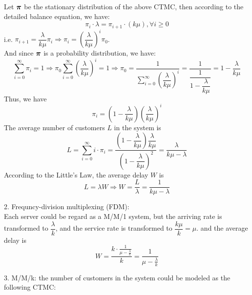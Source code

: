 \begin{homeworkProblem}
Let $\boldsymbol{\pi}$ be the stationary distribution of the above CTMC, then according to the detailed balance equation, we have:
$$\pi_i\cdot\lambda = \pi_{i+1}\cdot(k\mu), \forall i\geq 0$$
i.e. $\pi_{i+1} = \dfrac{\lambda}{k\mu}\pi_i\Rightarrow \pi_i = \left(\dfrac{\lambda}{k\mu}\right)^i\pi_0$. \\
And since $\boldsymbol{\pi}$ is a probability distribution, we have:
$$\sum_{i=0}^{\infty}\pi_i = 1\Rightarrow \pi_0\sum_{i=0}^{\infty}\left(\dfrac{\lambda}{k\mu}\right)^i = 1\Rightarrow \pi_0 = \dfrac{1}{\sum\limits_{i=0}^{\infty}\left(\dfrac{\lambda}{k\mu}\right)^i} = \dfrac{1}{\dfrac{1}{1-\dfrac{\lambda}{k\mu}}}=1-\dfrac{\lambda}{k\mu}$$
Thus, we have
$$\pi_i=\left(1-\dfrac{\lambda}{k\mu}\right)\left(\dfrac{\lambda}{k\mu}\right)^i$$
The average number of customers $L$ in the system is
$$L=\sum_{i=0}^{\infty}i\cdot\pi_i = \dfrac{\left(1-\dfrac{\lambda}{k\mu}\right)\dfrac{\lambda}{k\mu}}{\left(1-\dfrac{\lambda}{k\mu}\right)^2}=\dfrac{\lambda}{k\mu-\lambda}$$
According to the Little's Law, the average delay $W$ is
$$L=\lambda W\Rightarrow W=\dfrac{L}{\lambda}=\dfrac{1}{k\mu-\lambda}$$

2. Frequncy-division multiplexing (FDM): \\
Each server could be regard as a M/M/1 system, but the arriving rate is transformed to $\dfrac{\lambda}{k}$, and the service rate is transformed to $\dfrac{k\mu}{k}=\mu$.  and the average delay is
$$W=\dfrac{k\cdot \frac{1}{\mu-\frac{\lambda}{k}}}{k}=\dfrac{1}{\mu-\frac{\lambda}{k}}$$

3. M/M/k: the number of customers in the system could be modeled as the following CTMC:
\begin{center}
\end{center}
\end{homeworkProblem}
